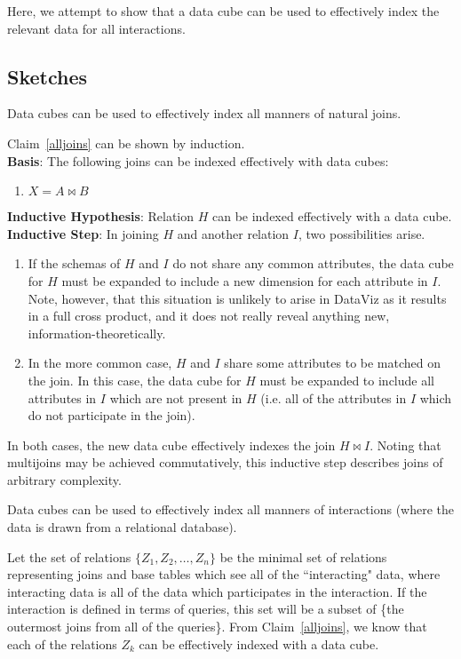 Here, we attempt to show that a data cube can be used to effectively index the relevant data for all interactions.
\subsection{Sketches}
\begin{claim}\label{alljoins}
Data cubes can be used to effectively index all manners of natural joins.
\end{claim}

\begin{sketch}
Claim~\ref{alljoins} can be shown by induction.\\
\textbf{Basis}: The following joins can be indexed effectively with data cubes:
\begin{enumerate}
	\item $X = A\bowtie{}B$
\end{enumerate}
\textbf{Inductive Hypothesis}: Relation $H$ can be indexed effectively with a data cube.\\
\textbf{Inductive Step}: In joining $H$ and another relation $I$, two possibilities arise.
\begin{enumerate}
	\item If the schemas of $H$ and $I$ do not share any common attributes, the data cube for $H$ must be expanded to include a new dimension for each attribute in $I$.
	Note, however, that this situation is unlikely to arise in DataViz as it results in a full cross product, and it does not really reveal anything new, information-theoretically.
	\item In the more common case, $H$ and $I$ share some attributes to be matched on the join.
	In this case, the data cube for $H$ must be expanded to include all attributes in $I$ which are not present in $H$ (i.e. all of the attributes in $I$ which do not participate in the join).
\end{enumerate}
In both cases, the new data cube effectively indexes the join \mbox{$H\bowtie{}I$}.
Noting that multijoins may be achieved commutatively, this inductive step describes joins of arbitrary complexity.
\end{sketch}

\begin{claim}
Data cubes can be used to effectively index all manners of interactions (where the data is drawn from a relational database).
\end{claim}

\begin{sketch}
Let the set of relations $\{Z_1, Z_2, \ldots, Z_n\}$ be the minimal set of relations representing joins and base tables which see all of the ``interacting" data, where interacting data is all of the data which participates in the interaction.
If the interaction is defined in terms of queries, this set will be a subset of \{the outermost joins from all of the queries\}.
From Claim~\ref{alljoins}, we know that each of the relations $Z_k$ can be effectively indexed with a data cube.
\end{sketch}
